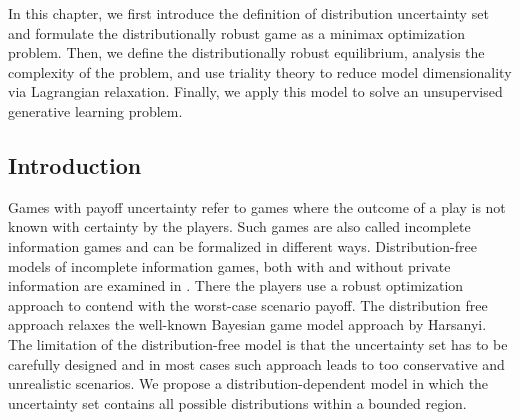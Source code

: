 \documentclass{article}
\begin{document}
In this chapter, we first introduce the definition of distribution uncertainty set and formulate the distributionally robust game as a minimax optimization problem. Then, we define the distributionally robust equilibrium, analysis the complexity of the problem, and use triality theory to reduce model dimensionality via Lagrangian relaxation. Finally, we apply this model to solve an unsupervised generative learning problem.


\subsection{Introduction}
Games with payoff uncertainty refer to games where the outcome of a play is not known with certainty by the players. Such games are also called incomplete information games and can be formalized in different ways. Distribution-free models of incomplete information games, both with and without private information are examined in \cite{Aghassi2006,doi:10.1137/080734510}. There the players use a robust optimization approach to contend with the worst-case scenario payoff. The distribution free approach relaxes the well-known Bayesian game model approach by Harsanyi. The limitation of the distribution-free model is that the uncertainty set has to be carefully designed and in most cases such approach leads to too conservative and unrealistic scenarios. We propose a distribution-dependent model in which the uncertainty set contains all possible distributions within a bounded region.
\end{document}
